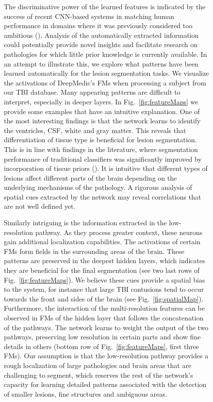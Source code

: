\documentclass[preprint,authoryear,12pt]{elsarticle}
\begin{document}
\begin{figure}[h]
The discriminative power of the learned features is indicated by the success of recent CNN-based systems in matching human performance in domains where it was previously considered too ambitious (\cite{he2015delving, Silver2016}). Analysis of the automatically extracted information could potentially provide novel insights and facilitate research on pathologies for which little prior knowledge is currently available. In an attempt to illustrate this, we explore what patterns have been learned automatically for the lesion segmentation tasks. We visualize the activations of DeepMedic's FMs when processing a subject from our TBI database. Many appearing patterns are difficult to interpret, especially in deeper layers. In Fig.~\ref{fig:featureMaps} we provide some examples that have an intuitive explanation. One of the most interesting findings is that the network learns to identify the ventricles, CSF, white and gray matter. This reveals that differentiation of tissue type is beneficial for lesion segmentation. This is in line with findings in the literature, where segmentation performance of traditional classifiers was significantly improved by incorporation of tissue priors (\cite{Leemput1999, Zikic2012}). It is intuitive that different types of lesions affect different parts of the brain depending on the underlying mechanisms of the pathology. A rigorous analysis of spatial cues extracted by the network may reveal correlations that are not well defined yet.

Similarly intriguing is the information extracted in the low-resolution pathway. As they process greater context, these neurons gain additional localization capabilities. The activations of certain FMs form fields in the surrounding areas of the brain. These patterns are preserved in the deepest hidden layers, which indicates they are beneficial for the final segmentation (see two last rows of Fig.~\ref{fig:featureMaps}). We believe these cues provide a spatial bias to the system, for instance that large TBI contusions tend to occur towards the front and sides of the brain (see Fig.~\ref{fig:spatialMap}). Furthermore, the interaction of the multi-resolution features can be observed in FMs of the hidden layer that follows the concatenation of the pathways. The network learns to weight the output of the two pathways, preserving low resolution in certain parts and show fine details in others (bottom row of Fig.~\ref{fig:featureMaps}, first three FMs). Our assumption is that the low-resolution pathway provides a rough localization of large pathologies and brain areas that are challenging to segment, which reserves the rest of the network's capacity for learning detailed patterns associated with the detection of smaller lesions, fine structures and ambiguous areas.


\end{figure}
\end{document}

